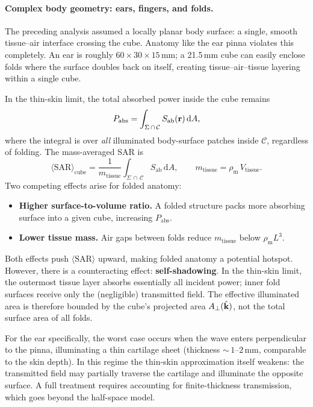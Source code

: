 \documentclass[11pt,a4paper]{article}
\theoremstyle{definition}
\theoremstyle{remark}
\newcommand{\Sab}{S_{\mathrm{ab}}}
\newcommand{\khat}{\hat{\vb{k}}}
\newcommand{\SAR}{\ensuremath{\mathrm{SAR}}}
\newcommand{\rhom}{\rho_{\mathrm{m}}}
\begin{document}
\paragraph{Complex body geometry: ears, fingers, and folds.}
The preceding analysis assumed a locally planar body surface: a single,
smooth tissue--air interface crossing the cube.  Anatomy like the ear pinna
violates this completely.  An ear is roughly $60 \times 30 \times 15$\,mm;
a 21.5\,mm cube can easily enclose folds where the surface doubles back on
itself, creating tissue--air--tissue layering within a single cube.

In the thin-skin limit, the total absorbed power inside the cube remains
\begin{equation}\label{eq:Pabs-general}
  P_{\mathrm{abs}} = \int_{\Sigma\,\cap\,\mathcal{C}} \Sab(\vb{r})\,\mathrm{d}A,
\end{equation}
where the integral is over \emph{all} illuminated body-surface patches inside
$\mathcal{C}$, regardless of folding.  The mass-averaged SAR is
\begin{equation}\label{eq:SAR-general}
  \langle\SAR\rangle_{\mathrm{cube}}
  = \frac{1}{m_{\mathrm{tissue}}}
    \int_{\Sigma\,\cap\,\mathcal{C}} \Sab\,\mathrm{d}A,
  \qquad
  m_{\mathrm{tissue}} = \rhom\,V_{\mathrm{tissue}}.
\end{equation}
Two competing effects arise for folded anatomy:
\begin{itemize}[nosep]
\item \textbf{Higher surface-to-volume ratio.}  A folded structure packs more
  absorbing surface into a given cube, increasing $P_{\mathrm{abs}}$.
\item \textbf{Lower tissue mass.}  Air gaps between folds reduce
  $m_{\mathrm{tissue}}$ below $\rhom L^3$.
\end{itemize}
Both effects push $\langle\SAR\rangle$ upward, making folded anatomy a
potential hotspot.  However, there is a counteracting effect:
\textbf{self-shadowing}.  In the thin-skin limit, the outermost tissue layer
absorbs essentially all incident power; inner fold surfaces receive only the
(negligible) transmitted field.  The effective illuminated area is therefore
bounded by the cube's projected area $A_\perp(\khat)$, not the total surface
area of all folds.

For the ear specifically, the worst case occurs when the wave enters
perpendicular to the pinna, illuminating a thin cartilage sheet (thickness
${\sim}\,1$--$2$\,mm, comparable to the skin depth).  In this regime the
thin-skin approximation itself weakens: the transmitted field may partially
traverse the cartilage and illuminate the opposite surface.  A full treatment
requires accounting for finite-thickness transmission, which goes beyond the
half-space model.
\end{document}
